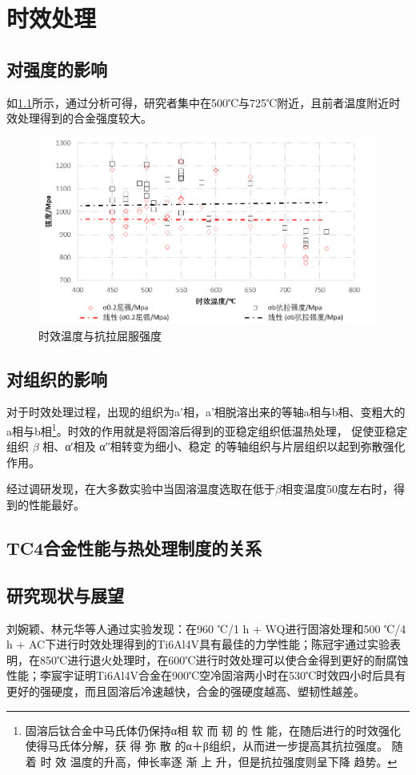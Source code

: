 \documentclass[
class = book,
zihao = -4,
font = noto,
paper = a4paper,
openany
]{easybook}
\newcommand{\ti}{Ti6Al4V}
\begin{document}
\chapter{时效处理}

\section{对强度的影响}
如\ref{fig:时效温度与抗拉屈服强度}所示，通过分析可得，研究者集中在500℃与725℃附近，且前者温度附近时效处理得到的合金强度较大。
\begin{figure}[h!]
	\centering
	\includegraphics[width=0.7\linewidth]{时效温度与强度}
	\caption{时效温度与抗拉屈服强度}
	\label{fig:时效温度与抗拉屈服强度}
\end{figure}


\section{对组织的影响}

对于时效处理过程，出现的组织为a'相，a'相脱溶出来的等轴a相与b相、变粗大的a相与b相\footnote{固溶后钛合金中马氏体仍保持α相 软 而 韧 的 性 能，在随后进行的时效强化使得马氏体分解，获 得 弥 散 的α＋β组织，从而进一步提高其抗拉强度。 随 着 时 效 温度的升高，伸长率逐 渐 上 升，但是抗拉强度则呈下降 趋势。}。\cite{zhanghaoyinGurongShixiaoduiTC4taihejinzuzhihelixuexingnengdeyingxiang2014}时效的作用就是将固溶后得到的亚稳定组织低温热处理， 促使亚稳定组织 $\beta$ 相、α′相及 α′′相转变为细小、稳定 的等轴组织与片层组织以起到弥散强化作用。


经过调研发现，在大多数实验中当固溶温度选取在低于$ \beta $相变温度50度左右时，得到的性能最好。
\section{TC4合金性能与热处理制度的关系}

\section{研究现状与展望}
 刘婉颖、林元华等人通过实验发现：在960 ℃/1 h + WQ进行固溶处理和500 ℃/4 h + AC下进行时效处理得到的\ti 具有最佳的力学性能\cite{LiuWanYingBuTongReChuLiGongYiDuiTi6Al4VTaiHeJinWeiGuanJieGouHeLiXueXingNengYingXiangYingWen2017}；陈冠宇通过实验表明，在850℃进行退火处理时，在600℃进行时效处理可以使合金得到更好的耐腐蚀性能\cite{1200}；李宸宇证明\ti 合金在900℃空冷固溶两小时在530℃时效四小时后具有更好的强硬度，而且固溶后冷速越快，合金的强硬度越高、塑韧性越差\cite{900}。%
\end{document}
